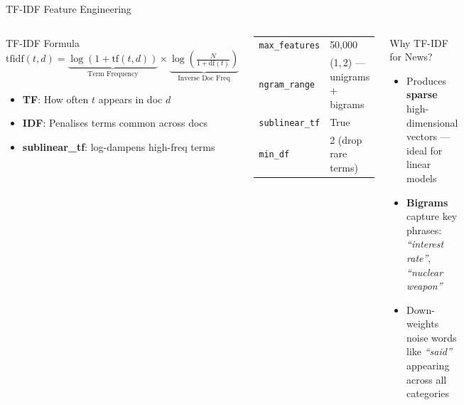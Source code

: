 \documentclass[aspectratio=169,11pt]{beamer}
\begin{document}
\begin{frame}{TF-IDF Feature Engineering}
\begin{columns}[T]
  \vspace{-0.55cm}
    \begin{block}{TF-IDF Formula}
      \small
      \[
        \text{tfidf}(t,d) = \underbrace{\log(1+\text{tf}(t,d))}_{\text{Term Frequency}} \times \underbrace{\log\!\left(\tfrac{N}{1+\text{df}(t)}\right)}_{\text{Inverse Doc Freq}}
      \]
      \begin{itemize}\footnotesize
        \item \textbf{TF}: How often $t$ appears in doc $d$
        \item \textbf{IDF}: Penalises terms common across docs
        \item \textbf{sublinear\_tf}: log-dampens high-freq terms
      \end{itemize}
    \end{block}
    \vspace{-6pt}
    \begin{tcolorbox}[colback=accent!8,colframe=accent,title=Vectoriser Settings,fonttitle=\footnotesize\bfseries]
      \footnotesize
      \begin{tabular}{ll}
        \texttt{max\_features} & 50,000 \\
        \texttt{ngram\_range}  & (1,\,2) --- unigrams + bigrams \\
        \texttt{sublinear\_tf} & True \\
        \texttt{min\_df}       & 2 (drop rare terms) \\
      \end{tabular}
    \end{tcolorbox}
    \vspace{-0.55cm}
    \begin{block}{Why TF-IDF for News?}
      \footnotesize
      \begin{itemize}
        \item Produces \textbf{sparse} high-dimensional vectors --- ideal for linear models
        \item \textbf{Bigrams} capture key phrases: \textit{``interest rate''}, \textit{``nuclear weapon''}
        \item Down-weights noise words like \textit{``said''} appearing across all categories
      \end{itemize}
    \end{block}
    \vspace{-0.3cm}

\end{columns}
\end{frame}
\end{document}
